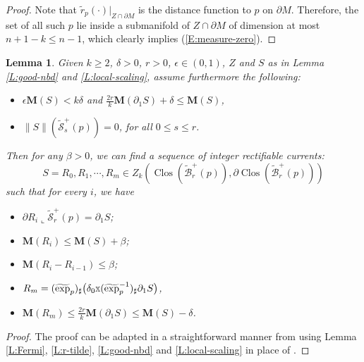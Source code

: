 \documentclass[10pt]{amsart}
\newtheorem{lemma}[theorem]{Lemma}
\theoremstyle{definition}
\theoremstyle{remark}
\numberwithin{equation}{section}
\newcommand{\be}{\beta}
\newcommand{\lc}{\llcorner}
\newcommand{\de}{\delta}
\newcommand{\ep}{\epsilon}
\newcommand{\M}{\mathbf{M}}
\newcommand{\ttimes}{\scalebox{0.7}{$\mathbb{X}$}}
\newcommand{\tE}{\widetilde{\exp}}
\newcommand{\tB}{\widetilde{B}}
\newcommand{\tBcal}{\widetilde{\mathcal{B}}}
\newcommand{\tScal}{\widetilde{\mathcal{S}}}
\newcommand{\tir}{\widetilde{r}}
\newcommand{\Clos}{\operatorname{Clos}}
\begin{document}
\begin{proof}
\vspace{0.3cm}
Note that $\tir_p(\cdot)|_{Z\cap \partial M}$ is the distance function to $p$ on $\partial M$. Therefore, the set of all such $p$ lie inside a submanifold of $Z \cap \partial M$ of dimension at most $n+1-k\leq n-1$, which clearly implies (\ref{E:measure-zero}).
\end{proof}



\begin{lemma}
\label{L:replace-cone}
Given $k\geq 2$, $\de>0$, $r>0$, $\ep \in (0,1)$, $Z$ and $S$ as in Lemma \ref{L:good-nbd} and \ref{L:local-scaling}, assume furthermore the following:
\begin{itemize}
\item $\ep\M(S)<k\de$ and $\frac{2r}{k} \M (\partial_1 S )+\de\leq \M(S)$,
\item $\|S\|(\tScal^+_s(p))=0$, for all $0\leq s\leq r$.
\end{itemize}
Then for any $\be>0$, we can find a sequence of integer rectifiable currents:
\[ S=R_0, R_1, \cdots, R_m \in Z_k (\Clos(\tBcal^+_r(p)), \partial \Clos(\tBcal^+_r(p)))\]
such that for every $i$, we have
\begin{itemize}
\item $\partial R_i\lc \tScal^+_r(p)=\partial_1 S$;
\item $\M(R_i)\leq \M(S)+\be$;
\item $\M(R_i-R_{i-1})\leq \be$;
\item $R_m=(\tE_p)_{\sharp}\big(\de_0\ttimes (\tE_p^{-1})_{\sharp}\partial_1 S\big)$, 
\item $\M(R_m)\leq \frac{2r}{k}\M(\partial_1 S) \leq \M(S)-\delta$.
\end{itemize}
\end{lemma}
\begin{proof}
The proof can be adapted in a straightforward manner from \cite[Lemma 3.5]{Pitts} using Lemma \ref{L:Fermi}, \ref{L:r-tilde}, \ref{L:good-nbd} and \ref{L:local-scaling} in place of \cite[3.4(4)(7)]{Pitts}.
\end{proof}












\end{document}
